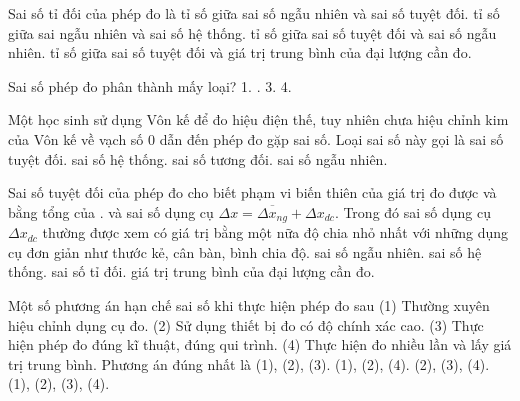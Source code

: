 \begin{ex}
Sai số tỉ đối của phép đo là
\choice
{tỉ số giữa sai số ngẫu nhiên và sai số tuyệt đối.}
{tỉ số giữa sai ngẫu nhiên và sai số hệ thống.}
{tỉ số giữa sai số tuyệt đối và sai số ngẫu nhiên.}
{\True tỉ số giữa sai số tuyệt đối và giá trị trung bình của đại lượng cần đo.}
\end{ex}

\begin{ex}
Sai số phép đo phân thành mấy loại?
\choice
{1.}
{.}
{3.}
{4.}
\end{ex}

\begin{ex}
Một học sinh sử dụng Vôn kế để đo hiệu điện thế, tuy nhiên chưa hiệu chỉnh kim của Vôn kế về vạch số 0 dẫn đến phép đo gặp sai số. Loại sai số này gọi là
\choice
{sai số tuyệt đối.}
{\True sai số hệ thống.}
{sai số tương đối.}
{sai số ngẫu nhiên.}
\end{ex}

\begin{ex}
Sai số tuyệt đối của phép đo cho biết phạm vi biến thiên của giá trị đo được và bằng tổng của . và sai số dụng cụ $\Delta x = \overline{\Delta x_{ng}} + \Delta x_{dc}$. Trong đó sai số dụng cụ $\Delta x_{dc}$ thường được xem có giá trị bằng một nữa độ chia nhỏ nhất với những dụng cụ đơn giản như thước kẻ, cân bàn, bình chia độ.
\choice
{\True sai số ngẫu nhiên.}
{sai số hệ thống.}
{sai số tỉ đối.}
{giá trị trung bình của đại lượng cần đo.}
\end{ex}

\begin{ex}
Một số phương án hạn chế sai số khi thực hiện phép đo sau
(1) Thường xuyên hiệu chỉnh dụng cụ đo.
(2) Sử dụng thiết bị đo có độ chính xác cao.
(3) Thực hiện phép đo đúng kĩ thuật, đúng qui trình.
(4) Thực hiện đo nhiều lần và lấy giá trị trung bình.
Phương án đúng nhất là
\choice
{(1), (2), (3).}
{(1), (2), (4).}
{(2), (3), (4).}
{\True (1), (2), (3), (4).}
\end{ex}

